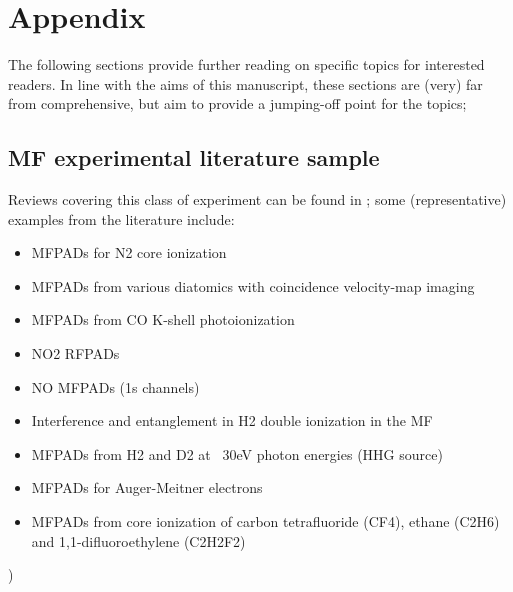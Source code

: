 \section{Appendix}

The following sections provide further reading on specific topics for interested readers. In line with the aims of this manuscript, these sections are (very) far from comprehensive, but aim to provide a jumping-off point for the topics; 

\subsection{MF experimental literature sample}

Reviews covering this class of experiment can be found in  \cite{Yagishita2005,Reid2012,dowek2012PhotoionizationDynamicsPhotoemission,Yagishita2015}; some (representative) examples from the literature include:

\begin{itemize}
\item MFPADs for N2 core ionization \cite{Shigemasa1995}
\item MFPADs from various diatomics with coincidence velocity-map imaging \cite{Eland2000} \cite{Hikosaka2000}
\item MFPADs from CO K-shell photoionization \cite{motoki2000KshellPhotoionizationCO}
\item NO2 RFPADs \cite{Toffoli2007}
\item NO MFPADs (1s channels) \cite{Li2007}
\item Interference and entanglement in H2 double ionization in the MF \cite{Akoury2007}
\item MFPADs from H2 and D2 at ~30eV photon energies (HHG source) \cite{Billaud2012a}
\item MFPADs for Auger-Meitner electrons \cite{Cryan2010,Cryan2012a}
\item MFPADs from core ionization of carbon tetrafluoride (CF4), ethane (C2H6) and 1,1-difluoroethylene (C2H2F2)\cite{Menssen2016}
\end{itemize}

)